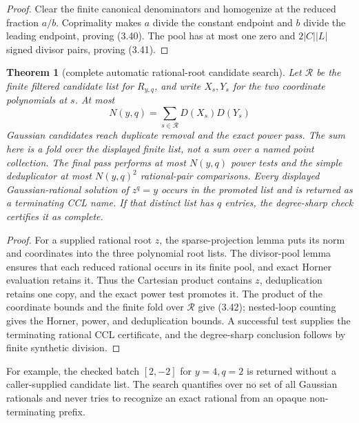 \documentclass[10pt]{article}
\newtheorem{theorem}{Theorem}[section]
\theoremstyle{definition}
\theoremstyle{remark}
\begin{document}
\begin{proof}
Clear the finite canonical denominators and homogenize at the reduced
fraction $a/b$.  Coprimality makes $a$ divide the constant endpoint and $b$
divide the leading endpoint, proving (3.40).  The pool has at most one zero
and $2|C||L|$ signed divisor pairs, proving (3.41).
\end{proof}

\begin{theorem}[complete automatic rational-root candidate search]
Let $\mathcal R$ be the
finite filtered candidate list for $R_{y,q}$, and write $X_s,Y_s$ for the two
coordinate polynomials at $s$.  At most
\[
 N(y,q)=\sum_{s\in\mathcal R}D(X_s)D(Y_s)
 \tag{3.42}
\]
Gaussian candidates reach duplicate removal and the exact power pass.  The
sum here is a fold over the displayed finite list, not a sum over a named
point collection.  The final pass performs at most $N(y,q)$ power tests and
the simple deduplicator at most $N(y,q)^2$ rational-pair comparisons.  Every
displayed Gaussian-rational solution of $z^q=y$ occurs in the promoted list
and is returned as a terminating CCL name.  If that distinct list has $q$
entries, the degree-sharp check certifies it as complete.
\end{theorem}

\begin{proof}
For a supplied rational root $z$, the sparse-projection lemma puts its norm
and coordinates into the three polynomial root lists.  The divisor-pool
lemma ensures that each reduced rational occurs in its finite pool, and exact
Horner evaluation retains it.  Thus the Cartesian product contains $z$,
deduplication retains one copy, and the exact power test promotes it.  The
product of the coordinate bounds and the finite fold over $\mathcal R$ give
(3.42); nested-loop counting gives the Horner, power, and deduplication
bounds.  A successful test supplies the terminating rational CCL certificate,
and the degree-sharp conclusion follows by finite synthetic division.
\end{proof}

For example, the checked batch $[2,-2]$ for $y=4,q=2$ is returned without a
caller-supplied candidate list.  The search quantifies over no set of all
Gaussian rationals and never tries to recognize an exact rational from an
opaque non-terminating prefix.
\end{document}
